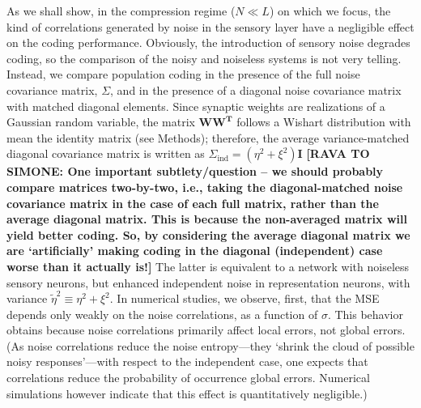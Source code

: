 \documentclass[a4paper]{article}%
\begin{document}
As we shall show, in the compression regime ($N\ll L$) on which we focus, the
kind of correlations generated by noise in the sensory layer have a negligible
effect on the coding performance. Obviously, the introduction of sensory noise
degrades coding, so the comparison of the noisy and noiseless systems is not
very telling. Instead, we compare population coding in the presence of the
full noise covariance matrix, $\Sigma$, and in the presence of a diagonal
noise covariance matrix with matched diagonal elements. Since synaptic weights
are realizations of a Gaussian random variable, the matrix $\mathbf{WW^{T}}$
follows a Wishart distribution with mean the identity matrix (see Methods);
therefore, the average variance-matched diagonal covariance matrix is written
as $\Sigma_{\text{ind}}=\left(  \eta^{2}+\xi^{2}\right)  \mathbf{I}$
\textbf{[RAVA TO SIMONE: One important subtlety/question -- we should probably
compare matrices two-by-two, i.e., taking the diagonal-matched noise
covariance matrix in the case of each full matrix, rather than the average
diagonal matrix. This is because the non-averaged matrix will yield better
coding. So, by considering the average diagonal matrix we are `artificially'
making coding in the diagonal (independent) case worse than it actually is!]}
The latter is equivalent to a network with noiseless sensory neurons, but
enhanced independent noise in representation neurons, with variance
$\tilde{\eta}^{2}\equiv\eta^{2}+\xi^{2}$. In numerical studies, we observe,
first, that the MSE depends only weakly on the noise correlations, as a
function of $\sigma$. This behavior obtains because noise correlations
primarily affect local errors, not global errors. (As noise correlations
reduce the noise entropy---they `shrink the cloud of possible noisy
responses'---with respect to the independent case, one expects that
correlations reduce the probability of occurrence global errors. Numerical
simulations however indicate that this effect is quantitatively negligible.)
\end{document}
